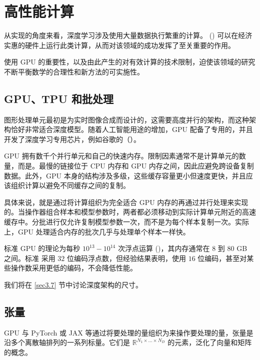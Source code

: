 \chapter{高性能计算}

从实现的角度来看，深度学习涉及使用大量数据执行繁重的计算。 () 可以在经济实惠的硬件上运行此类计算，从而对该领域的成功发挥了至关重要的作用。

使用 GPU 的重要性，以及由此产生的对有效计算的技术限制，迫使该领域的研究不断平衡数学的合理性和新方法的可实施性。

\section{GPU、TPU 和批处理}\label{sec2.1}

图形处理单元最初是为实时图像合成而设计的，这需要高度并行的架构，而这种架构恰好非常适合深度模型。随着人工智能用途的增加，GPU 配备了专用的，并且开发了深度学习专用芯片，例如谷歌的（）。

GPU 拥有数千个并行单元和自己的快速内存。限制因素通常不是计算单元的数量，而是。最慢的链接位于 CPU 内存和 GPU 内存之间，因此应避免跨设备复制数据。此外，GPU 本身的结构涉及多级，这些缓存容量更小但速度更快，并且应该组织计算以避免不同缓存之间的复制。

具体来说，就是通过将计算组织为完全适合 GPU 内存的再通过并行处理来实现的。当操作器组合样本和模型参数时，两者都必须移动到实际计算单元附近的高速缓存中。分批进行仅允许复制模型参数一次，而不是为每个样本复制一次。实际上，GPU 处理适合内存的批次几乎与处理单个样本一样快。

标准 GPU 的理论为每秒 $10^{13}-10^{14}$ 次浮点运算 ()，其内存通常在 $8$ 到 $80$ GB 之间。标准  采用 $32$ 位编码浮点数，但经验结果表明，使用 $16$ 位编码，甚至对某些操作数采用更低的编码，不会降低性能。

我们将在 \ref{sec3.7} 节中讨论深度架构的尺寸。

\section{张量}

GPU 与 PyTorch 或 JAX 等通过将要处理的量组织为来操作要处理的量，张量是沿多个离散轴排列的一系列标量。它们是 $\mathbb{R}^{N_1 \times \dots \times N_D}$ 的元素，泛化了向量和矩阵的概念。

